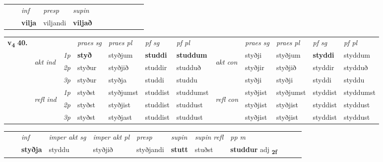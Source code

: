 \begin{tabular}{llllllllllll}
 & & \textit{inf}     & \textit{presp} & \textit{supin}       \\*
  & & \textbf{vilja}      & viljandi &  \textbf{viljað}   \\*
\cmidrule{1-12}
\end{tabular}



\begin{tabular}{llllllllllll} \toprule
\multirow{4}{*}{{{\textbf{v{\textsubscript{4}}} \Large{\textbf{40.}}}}}  & &   &  \textit{praes sg}  & \textit{praes pl}  &\textit{ pf sg} & \textit{pf pl} &  &  \textit{praes sg}  & \textit{praes pl}  & \textit{pf sg} & \textit{pf pl } \\*
	\cmidrule{4-7} \cmidrule{9-12}
 & \multirow{3}{*}{\begin{turn}{90}\textit{akt ind}\end{turn}} & {\textit{1p}} & \textbf{styð} & styðjum    & \textbf{studdi} & \textbf{studdum} & \multirow{3}{*}{\begin{turn}{90}\textit{akt con}\end{turn}} &styðji & styðjum & \textbf{styddi} & styddum\\*
& &  {\textit{2p}} &  styður  & styðjið   & studdir & studduð & & styðjir & styðjið & styddir & stydduð \\*
& &  {\textit{3p}} & styður & styðja   & studdi & studdu & & styðji & styðji& styddi & styddu  \\*
\cmidrule{4-7} \cmidrule{9-12}
 &\multirow{3}{*}{\begin{turn}{90}\textit{refl ind}\end{turn}} & {\textit{1p}} & styðst & styðjumst    & studdist & studdumst & \multirow{3}{*}{\begin{turn}{90}\textit{refl con}\end{turn}}  &styðjist & styðjumst & styddist & styddumst\\*
 &&  {\textit{2p}} &  styðst  & styðjist   & studdist & studdust & &styðjist & styðjist & styddist & styddust \\*
& &  {\textit{3p}} & styðst & styðjast   & studdist & studdust & & styðjist & styðjist& styddist & styddust  \\*
\cmidrule{4-7} \cmidrule{9-12}
\end{tabular}


\begin{tabular}{llllllllllll}
 & & \textit{inf} & \textit{imper akt sg} & \textit{imper akt pl}   & \textit{presp} & \textit{supin} & \textit{supin refl} & \textit{pp m}     \\*
  & & \textbf{styðja} & styddu  & styðjið   & styðjandi &  \textbf{stutt} & stuðst & \textbf{studdur} adj \textbf{\textsubscript{2f}} \\*
\cmidrule{1-12}
\end{tabular}



